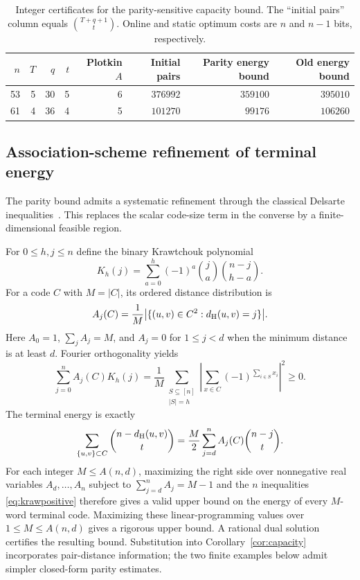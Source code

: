 \documentclass[11pt,a4paper]{article}
\begin{document}
\begin{table}[htbp]\centering\small
\begin{tabular}{@{}rrrrrrrr@{}}\toprule
$n$&$T$&$q$&$t$&Plotkin $A$&Initial pairs&Parity energy bound&Old energy bound\\\midrule
53&5&30&5&6&$376992$&$359100$&$395010$\\
61&4&36&4&5&$101270$&$99176$&$106260$\\\bottomrule
\end{tabular}
\caption{Integer certificates for the parity-sensitive capacity bound. The ``initial pairs'' column equals $\binom{T+q+1}t$. Online and static optimum costs are $n$ and $n-1$ bits, respectively.}\label{tab:parity}
\end{table}

\subsection{Association-scheme refinement of terminal energy}\label{sec:delsarte}
The parity bound admits a systematic refinement through the classical Delsarte inequalities~\cite{delsarte1973,macwilliams1977}. This replaces the scalar code-size term in the converse by a finite-dimensional feasible region.

For $0\le h,j\le n$ define the binary Krawtchouk polynomial
\[
K_h(j)=\sum_{a=0}^h(-1)^a\binom ja\binom{n-j}{h-a}.
\]
For a code $C$ with $M=|C|$, its ordered distance distribution is
\[
A_j(C)=\frac1M\bigl|\{(u,v)\in C^2:d_{\rm H}(u,v)=j\}\bigr|.
\]
Here $A_0=1$, $\sum_j A_j=M$, and $A_j=0$ for $1\le j<d$ when the minimum distance is at least $d$. Fourier orthogonality yields
\begin{equation}\label{eq:krawpositive}
\sum_{j=0}^n A_j(C)K_h(j)
=\frac1M\sum_{\substack{S\subseteq[n]\\|S|=h}}\left|\sum_{x\in C}(-1)^{\sum_{i\in S}x_i}\right|^2\ge0.
\end{equation}
The terminal energy is exactly
\begin{equation}\label{eq:delsarteenergy}
\sum_{\{u,v\}\subset C}\binom{n-d_{\rm H}(u,v)}t
=\frac M2\sum_{j=d}^n A_j(C)\binom{n-j}t.
\end{equation}
For each integer $M\le A(n,d)$, maximizing the right side over nonnegative real variables $A_d,\ldots,A_n$ subject to $\sum_{j=d}^n A_j=M-1$ and the $n$ inequalities \eqref{eq:krawpositive} therefore gives a valid upper bound on the energy of every $M$-word terminal code. Maximizing these linear-programming values over $1\le M\le A(n,d)$ gives a rigorous upper bound. A rational dual solution certifies the resulting bound. Substitution into Corollary~\ref{cor:capacity} incorporates pair-distance information; the two finite examples below admit simpler closed-form parity estimates.
\end{document}
